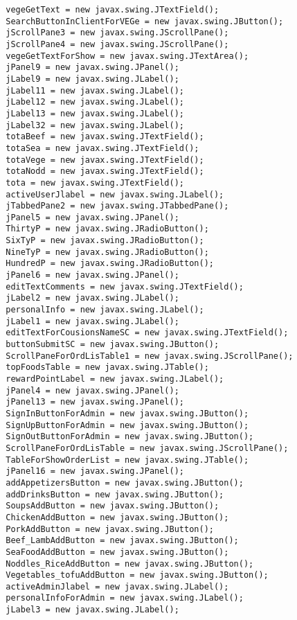\documentclass[12pt,a4paper]{article}
\begin{document}
\begin{lstlisting}
        vegeGetText = new javax.swing.JTextField();
        SearchButtonInClientForVEGe = new javax.swing.JButton();
        jScrollPane3 = new javax.swing.JScrollPane();
        jScrollPane4 = new javax.swing.JScrollPane();
        vegeGetTextForShow = new javax.swing.JTextArea();
        jPanel9 = new javax.swing.JPanel();
        jLabel9 = new javax.swing.JLabel();
        jLabel11 = new javax.swing.JLabel();
        jLabel12 = new javax.swing.JLabel();
        jLabel13 = new javax.swing.JLabel();
        jLabel32 = new javax.swing.JLabel();
        totaBeef = new javax.swing.JTextField();
        totaSea = new javax.swing.JTextField();
        totaVege = new javax.swing.JTextField();
        totaNodd = new javax.swing.JTextField();
        tota = new javax.swing.JTextField();
        activeUserJlabel = new javax.swing.JLabel();
        jTabbedPane2 = new javax.swing.JTabbedPane();
        jPanel5 = new javax.swing.JPanel();
        ThirtyP = new javax.swing.JRadioButton();
        SixTyP = new javax.swing.JRadioButton();
        NineTyP = new javax.swing.JRadioButton();
        HundredP = new javax.swing.JRadioButton();
        jPanel6 = new javax.swing.JPanel();
        editTextComments = new javax.swing.JTextField();
        jLabel2 = new javax.swing.JLabel();
        personalInfo = new javax.swing.JLabel();
        jLabel1 = new javax.swing.JLabel();
        editTextForCousionsNameSC = new javax.swing.JTextField();
        buttonSubmitSC = new javax.swing.JButton();
        ScrollPaneForOrdLisTable1 = new javax.swing.JScrollPane();
        topFoodsTable = new javax.swing.JTable();
        rewardPointLabel = new javax.swing.JLabel();
        jPanel4 = new javax.swing.JPanel();
        jPanel13 = new javax.swing.JPanel();
        SignInButtonForAdmin = new javax.swing.JButton();
        SignUpButtonForAdmin = new javax.swing.JButton();
        SignOutButtonForAdmin = new javax.swing.JButton();
        ScrollPaneForOrdLisTable = new javax.swing.JScrollPane();
        TableForShowOrderList = new javax.swing.JTable();
        jPanel16 = new javax.swing.JPanel();
        addAppetizersButton = new javax.swing.JButton();
        addDrinksButton = new javax.swing.JButton();
        SoupsAddButton = new javax.swing.JButton();
        ChickenAddButton = new javax.swing.JButton();
        PorkAddButton = new javax.swing.JButton();
        Beef_LambAddButton = new javax.swing.JButton();
        SeaFoodAddButton = new javax.swing.JButton();
        Noddles_RiceAddButton = new javax.swing.JButton();
        Vegetables_tofuAddButton = new javax.swing.JButton();
        activeAdminJlabel = new javax.swing.JLabel();
        personalInfoForAdmin = new javax.swing.JLabel();
        jLabel3 = new javax.swing.JLabel();


\end{lstlisting}
\end{document}
